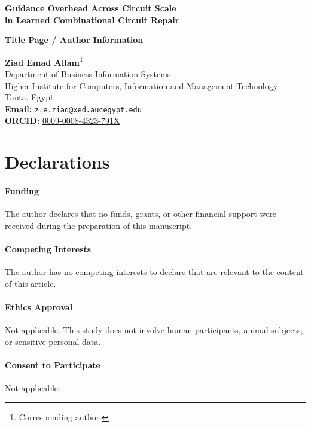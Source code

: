 \documentclass[11pt,a4paper]{article}
\begin{document}
\begin{center}
{\LARGE\textbf{Guidance Overhead Across Circuit Scale\\in Learned Combinational Circuit Repair}\par}
\vspace{1.5em}

{\large\textbf{Title Page / Author Information}\par}
\vspace{2em}

\textbf{Ziad Emad Allam}\footnote{Corresponding author.} \\
\vspace{0.5em}
Department of Business Information Systems \\
Higher Institute for Computers, Information and Management Technology \\
Tanta, Egypt \\
\vspace{0.5em}
\textbf{Email:} \texttt{z.e.ziad@xed.aucegypt.edu} \\
\textbf{ORCID:} \href{https://orcid.org/0009-0008-4323-791X}{0009-0008-4323-791X}
\end{center}

\vspace{3em}

\section*{Declarations}

\paragraph{Funding}
The author declares that no funds, grants, or other financial support were received during the preparation of this manuscript.

\paragraph{Competing Interests}
The author has no competing interests to declare that are relevant to the content of this article.

\paragraph{Ethics Approval}
Not applicable. This study does not involve human participants, animal subjects, or sensitive personal data.

\paragraph{Consent to Participate}
Not applicable.
\end{document}
